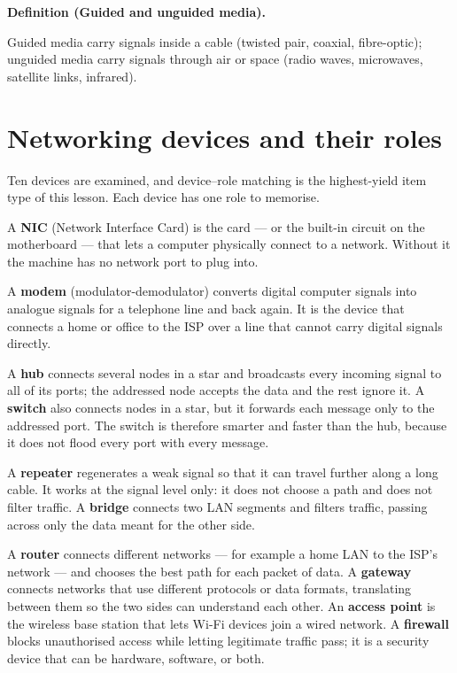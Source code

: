 \documentclass[11pt]{article}
\newenvironment{definitionbox}[1]{%
  \par\noindent\textbf{Definition (#1).}\ \itshape
}{\par\vspace{0.3em}}
\begin{document}
\begin{definitionbox}{Guided and unguided media}
Guided media carry signals inside a cable (twisted pair, coaxial,
fibre-optic); unguided media carry signals through air or space (radio
waves, microwaves, satellite links, infrared).
\end{definitionbox}

\section{Networking devices and their roles}
Ten devices are examined, and device--role matching is the highest-yield item
type of this lesson. Each device has one role to memorise.

A \textbf{NIC} (Network Interface Card) is the card --- or the built-in
circuit on the motherboard --- that lets a computer physically connect to a
network. Without it the machine has no network port to plug into.

A \textbf{modem} (modulator-demodulator) converts digital computer signals
into analogue signals for a telephone line and back again. It is the device
that connects a home or office to the ISP over a line that cannot carry
digital signals directly.

A \textbf{hub} connects several nodes in a star and broadcasts every
incoming signal to all of its ports; the addressed node accepts the data and
the rest ignore it. A \textbf{switch} also connects nodes in a star, but it
forwards each message only to the addressed port. The switch is therefore
smarter and faster than the hub, because it does not flood every port with
every message.

A \textbf{repeater} regenerates a weak signal so that it can travel further
along a long cable. It works at the signal level only: it does not choose a
path and does not filter traffic. A \textbf{bridge} connects two LAN
segments and filters traffic, passing across only the data meant for the
other side.

A \textbf{router} connects different networks --- for example a home LAN to
the ISP's network --- and chooses the best path for each packet of data. A
\textbf{gateway} connects networks that use different protocols or data
formats, translating between them so the two sides can understand each
other. An \textbf{access point} is the wireless base station that lets Wi-Fi
devices join a wired network. A \textbf{firewall} blocks unauthorised access
while letting legitimate traffic pass; it is a security device that can be
hardware, software, or both.
\end{document}
